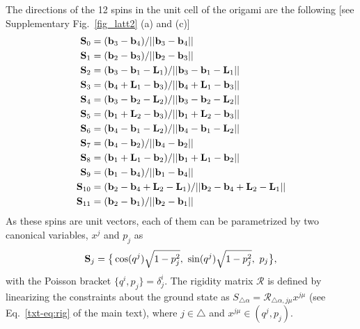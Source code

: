 \documentclass[a4paper,aps,prl,floatfix,showpacs,superscriptaddress,notitlepage]{revtex4-1}
\begin{document}
The directions of the 12 spins in the unit cell of the origami are the following [see Supplementary Fig.~\ref{fig_latt2} (a) and (c)]
\begin{equation}
\begin{split}
 {\bf S}_0    &= ({\bf b}_3 - {\bf b}_4)/|| {\bf b}_3 - {\bf b}_4 || \\ 
 {\bf S}_1    &= ({\bf b}_2 - {\bf b}_3)/|| {\bf b}_2 - {\bf b}_3 || \\
 {\bf S}_2    &= ({\bf b}_3 - {\bf b}_1 - {\bf L}_1)/|| {\bf b}_3 - {\bf b}_1 - {\bf L}_1 || \\
 {\bf S}_3    &= ({\bf b}_4 + {\bf L}_1 - {\bf b}_3)/|| {\bf b}_4 + {\bf L}_1 - {\bf b}_3 || \\
 {\bf S}_4    &= ({\bf b}_3 - {\bf b}_2 - {\bf L}_2)/|| {\bf b}_3 - {\bf b}_2 - {\bf L}_2 || \\
 {\bf S}_5    &= ({\bf b}_1 + {\bf L}_2 - {\bf b}_3)/|| {\bf b}_1 + {\bf L}_2 - {\bf b}_3 || \\
 {\bf S}_6    &= ({\bf b}_4 - {\bf b}_1 - {\bf L}_2)/|| {\bf b}_4 - {\bf b}_1 - {\bf L}_2 || \\
 {\bf S}_7    &= ({\bf b}_4 - {\bf b}_2)/|| {\bf b}_4 - {\bf b}_2 || \\
 {\bf S}_8    &= ({\bf b}_1 + {\bf L}_1 - {\bf b}_2)/|| {\bf b}_1 + {\bf L}_1 - {\bf b}_2 || \\
 {\bf S}_9    &= ({\bf b}_1 - {\bf b}_4)/|| {\bf b}_1 - {\bf b}_4 || \\
 {\bf S}_{10} &= ({\bf b}_2 - {\bf b}_4 + {\bf L}_2 - {\bf L}_1)/|| {\bf b}_2 - {\bf b}_4 + {\bf L}_2 - {\bf L}_1 || \\
 {\bf S}_{11} &= ({\bf b}_2 - {\bf b}_1)/|| {\bf b}_2 - {\bf b}_1 || \\ 
\end{split}
\end{equation}
As these spins are unit vectors, each of them can be parametrized by two canonical variables, $x^j$ and $p_j$ as
\begin{equation}
  {\bf{S}}_j=\big\{ \cos(q^j)\sqrt{1-p^2_j},~\sin(q^j)\sqrt{1-p^2_j},~p_j \big\}, \nonumber
\end{equation}
with the Poisson bracket $\{q^i,p_j\}=\delta^i_j$. The rigidity matrix ${\mathcal R}$ is defined by linearizing the constraints about the ground state as $S_{\triangle\alpha} = {\mathcal R}_{\triangle\alpha,j\mu}x^{j\mu}$ (see Eq.~\ref{txt-eq:rig} of the main text), where $j\in\triangle$ and $x^{j\mu}\in(q^j,p_j)$. \\
\end{document}
